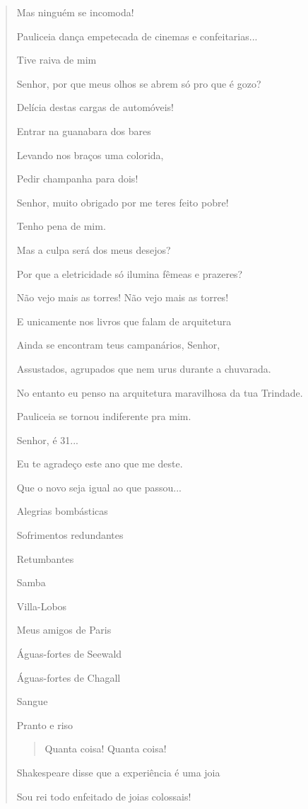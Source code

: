 \begin{verse}
Mas ninguém se incomoda!

Pauliceia dança empetecada de cinemas e confeitarias...

Tive raiva de mim

Senhor, por que meus olhos se abrem só pro que é gozo?

Delícia destas cargas de automóveis!

Entrar na guanabara dos bares

Levando nos braços uma colorida,

Pedir champanha para dois!

Senhor, muito obrigado por me teres feito pobre!

Tenho pena de mim.

Mas a culpa será dos meus desejos?

Por que a eletricidade só ilumina fêmeas e prazeres?

Não vejo mais as torres! Não vejo mais as torres!

E unicamente nos livros que falam de arquitetura

Ainda se encontram teus campanários, Senhor,

Assustados, agrupados que nem urus durante a chuvarada.

No entanto eu penso na arquitetura maravilhosa da tua Trindade.

Pauliceia se tornou indiferente pra mim.

Senhor, é 31...

Eu te agradeço este ano que me deste.

Que o novo seja igual ao que passou...

Alegrias bombásticas

Sofrimentos redundantes

Retumbantes

Samba

Villa-Lobos

Meus amigos de Paris

Águas-fortes de Seewald

Águas-fortes de Chagall

Sangue

Pranto e riso

\begin{quote}
Quanta coisa! Quanta coisa!
\end{quote}

Shakespeare disse que a experiência é uma joia

Sou rei todo enfeitado de joias colossais!


\end{verse}

